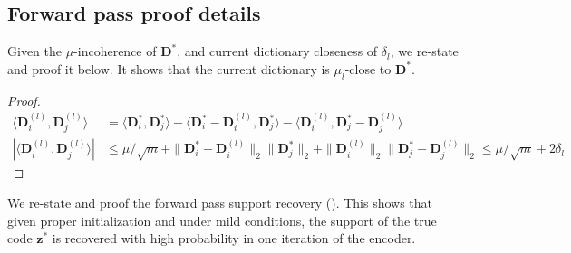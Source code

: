 \documentclass[10pt]{article} %
\newcommand{\D}{{\bm D}}
\newcommand{\z}{{\bm z}}
\begin{document}
\subsection{Forward pass proof details}\label{sec:fwdproof}
%
Given the $\mu$-incoherence of $\D^{\ast}$, and current dictionary closeness of $\delta_l$, we re-state  and proof it below. It shows that the current dictionary is $\mu_l$-close to $\D^{\ast}$.
%
\mul*
%
\begin{proof} 
\begin{equation}
\begin{aligned}
\langle \D_i^{(l)}, \D_j^{(l)} \rangle  &= \langle \D_i^{\ast}, \D_j^{\ast} \rangle - \langle \D_i^{\ast} - \D_i^{(l)}, \D_j^{\ast} \rangle - \langle \D_i^{(l)}, \D_j^{\ast} -\D_j^{(l)} \rangle\\
| \langle \D_i^{(l)}, \D_j^{(l)} \rangle |  &\leq \mu / \sqrt{m} +  \| \D_i^{\ast} + \D_i^{(l)}\|_2 \| \D_j^{\ast} \|_2 + \|\D_i^{(l)}\|_2 \| \D_j^{\ast} -\D_j^{(l)} \|_2 \leq \mu / \sqrt{m} + 2 \delta_l
\end{aligned}
\end{equation}
\end{proof}
We re-state and proof the forward pass support recovery (). This shows that given proper initialization and under mild conditions, the support of the true code $\z^{\ast}$ is recovered with high probability in one iteration of the encoder.
%
\fwdsupprec*
%
\end{document}
